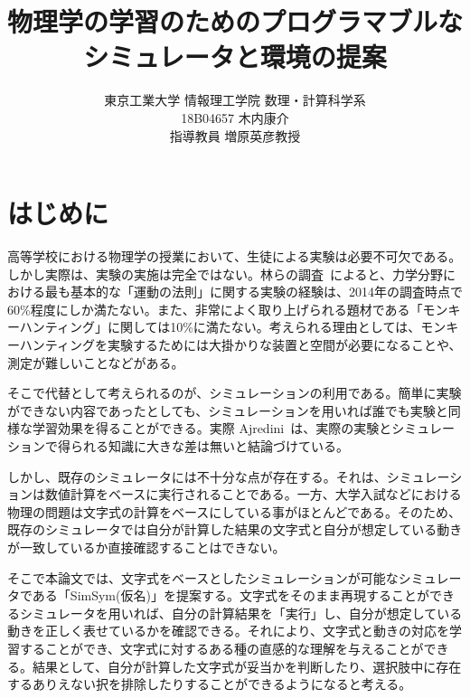 \documentclass[11pt, a4paper, oneside, twocolumn]{jsarticle}
\title{物理学の学習のためのプログラマブルな
\\シミュレータと環境の提案}
\author{東京工業大学 情報理工学院 数理・計算科学系\\18B04657 木内康介\\指導教員 増原英彦教授}
\date{}
\newcommand{\simname}{SimSym(仮名)}
\begin{document}
\maketitle

\section{はじめに} \label{intro}
高等学校における物理学の授業において、生徒による実験は必要不可欠である。しかし実際は、実験の実施は完全ではない。林らの調査~\cite{2015KJ00010038066}によると、力学分野における最も基本的な「運動の法則」に関する実験の経験は、2014年の調査時点で60\%程度にしか満たない。また、非常によく取り上げられる題材である「モンキーハンティング」に関しては10\%に満たない。考えられる理由としては、モンキーハンティングを実験するためには大掛かりな装置と空間が必要になることや、測定が難しいことなどがある。

そこで代替として考えられるのが、シミュレーションの利用である。簡単に実験ができない内容であったとしても、シミュレーションを用いれば誰でも実験と同様な学習効果を得ることができる。実際 Ajredini~\cite{ajredini_real_2014}は、実際の実験とシミュレーションで得られる知識に大きな差は無いと結論づけている。


しかし、既存のシミュレータには不十分な点が存在する。それは、シミュレーションは数値計算をベースに実行されることである。一方、大学入試などにおける物理の問題は文字式の計算をベースにしている事がほとんどである。そのため、既存のシミュレータでは自分が計算した結果の文字式と自分が想定している動きが一致しているか直接確認することはできない。

そこで本論文では、文字式をベースとしたシミュレーションが可能なシミュレータである「\simname」を提案する。文字式をそのまま再現することができるシミュレータを用いれば、自分の計算結果を「実行」し、自分が想定している動きを正しく表せているかを確認できる。それにより、文字式と動きの対応を学習することができ、文字式に対するある種の直感的な理解を与えることができる。結果として、自分が計算した文字式が妥当かを判断したり、選択肢中に存在するありえない択を排除したりすることができるようになると考える。
\end{document}

